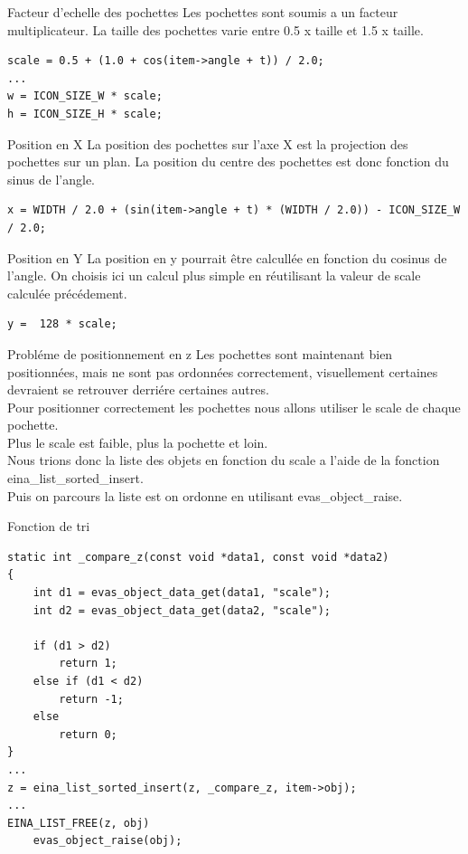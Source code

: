 \documentclass{beamer}
\begin{document}
\begin{frame}[fragile]{Facteur d'echelle des pochettes}
Les pochettes sont soumis a un facteur multiplicateur. La taille des pochettes varie entre 
0.5 x taille et 1.5 x taille.\\
\begin{lstlisting}
scale = 0.5 + (1.0 + cos(item->angle + t)) / 2.0;
...
w = ICON_SIZE_W * scale;
h = ICON_SIZE_H * scale;
\end{lstlisting}
\end{frame}

\begin{frame}[fragile]{Position en X}
La position des pochettes sur l'axe X est la projection des pochettes sur un plan. La position du centre des pochettes est donc fonction du sinus de l'angle.
\begin{lstlisting}
x = WIDTH / 2.0 + (sin(item->angle + t) * (WIDTH / 2.0)) - ICON_SIZE_W  / 2.0;
\end{lstlisting}
\end{frame}

\begin{frame}[fragile]{Position en Y}
La position en y pourrait être calcullée en fonction du cosinus de l'angle. On choisis ici un calcul plus simple en réutilisant la valeur de scale calculée précédement.
\begin{lstlisting}
y =  128 * scale;
\end{lstlisting}
\end{frame}

\begin{frame}[fragile]{Probléme de positionnement en z}
Les pochettes sont maintenant bien positionnées, mais ne sont pas ordonnées correctement, visuellement certaines devraient se retrouver derriére certaines autres.\\
Pour positionner correctement les pochettes nous allons utiliser le scale de chaque pochette.\\
Plus le scale est faible, plus la pochette et loin.\\
Nous trions donc la liste des objets en fonction du scale a l'aide de la fonction eina\_list\_sorted\_insert.\\
Puis on parcours la liste est on ordonne en utilisant evas\_object\_raise.
\end{frame}

\begin{frame}[fragile]{Fonction de tri}
\begin{lstlisting}
static int _compare_z(const void *data1, const void *data2)
{
    int d1 = evas_object_data_get(data1, "scale");
    int d2 = evas_object_data_get(data2, "scale");

    if (d1 > d2)
        return 1;
    else if (d1 < d2)
        return -1;
    else
        return 0;
}
...
z = eina_list_sorted_insert(z, _compare_z, item->obj);
...
EINA_LIST_FREE(z, obj)
    evas_object_raise(obj);
\end{lstlisting}
\end{frame}
\end{document}
